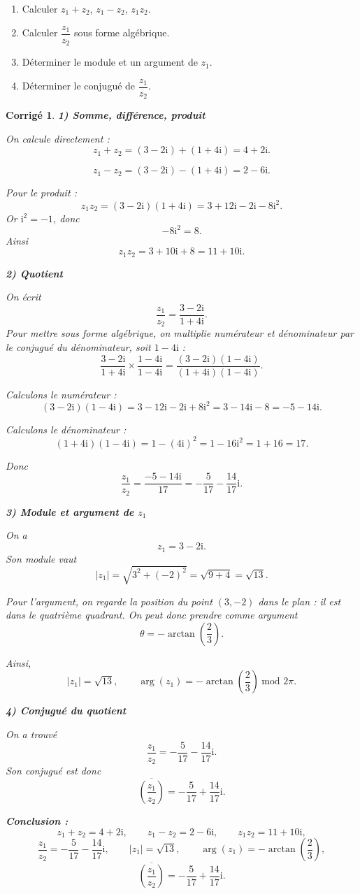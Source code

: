 \documentclass[11pt,a4paper]{article}
\newtheorem*{corrige}{Corrigé}
\newcommand{\ii}{\mathrm{i}}
\begin{document}
\begin{enumerate}
    \item Calculer \(z_1+z_2\), \(z_1-z_2\), \(z_1z_2\).
    \item Calculer \(\dfrac{z_1}{z_2}\) sous forme algébrique.
    \item Déterminer le module et un argument de \(z_1\).
    \item Déterminer le conjugué de \(\dfrac{z_1}{z_2}\).
\end{enumerate}

\begin{corrige}
\textbf{1) Somme, différence, produit}

On calcule directement :
\[
z_1+z_2=(3-2\ii)+(1+4\ii)=4+2\ii.
\]

\[
z_1-z_2=(3-2\ii)-(1+4\ii)=2-6\ii.
\]

Pour le produit :
\[
z_1z_2=(3-2\ii)(1+4\ii)=3+12\ii-2\ii-8\ii^2.
\]
Or \(\ii^2=-1\), donc
\[
-8\ii^2=8.
\]
Ainsi
\[
z_1z_2=3+10\ii+8=11+10\ii.
\]

\textbf{2) Quotient}

On écrit
\[
\frac{z_1}{z_2}=\frac{3-2\ii}{1+4\ii}.
\]
Pour mettre sous forme algébrique, on multiplie numérateur et dénominateur par le conjugué du dénominateur, soit \(1-4\ii\) :
\[
\frac{3-2\ii}{1+4\ii}\times \frac{1-4\ii}{1-4\ii}
= \frac{(3-2\ii)(1-4\ii)}{(1+4\ii)(1-4\ii)}.
\]

Calculons le numérateur :
\[
(3-2\ii)(1-4\ii)=3-12\ii-2\ii+8\ii^2=3-14\ii-8=-5-14\ii.
\]

Calculons le dénominateur :
\[
(1+4\ii)(1-4\ii)=1-(4\ii)^2=1-16\ii^2=1+16=17.
\]

Donc
\[
\frac{z_1}{z_2}=\frac{-5-14\ii}{17}=-\frac{5}{17}-\frac{14}{17}\ii.
\]

\textbf{3) Module et argument de \(z_1\)}

On a
\[
z_1=3-2\ii.
\]
Son module vaut
\[
|z_1|=\sqrt{3^2+(-2)^2}=\sqrt{9+4}=\sqrt{13}.
\]

Pour l'argument, on regarde la position du point \((3,-2)\) dans le plan : il est dans le quatrième quadrant. On peut donc prendre comme argument
\[
\theta=-\arctan\left(\frac{2}{3}\right).
\]

Ainsi,
\[
|z_1|=\sqrt{13},
\qquad
\arg(z_1)=-\arctan\left(\frac{2}{3}\right)\ \text{mod }2\pi.
\]

\textbf{4) Conjugué du quotient}

On a trouvé
\[
\frac{z_1}{z_2}=-\frac{5}{17}-\frac{14}{17}\ii.
\]
Son conjugué est donc
\[
\overline{\left(\frac{z_1}{z_2}\right)}=-\frac{5}{17}+\frac{14}{17}\ii.
\]

\textbf{Conclusion :}
\[
z_1+z_2=4+2\ii,\qquad
z_1-z_2=2-6\ii,\qquad
z_1z_2=11+10\ii,
\]
\[
\frac{z_1}{z_2}=-\frac{5}{17}-\frac{14}{17}\ii,
\qquad
|z_1|=\sqrt{13},
\qquad
\arg(z_1)=-\arctan\left(\frac{2}{3}\right),
\]
\[
\overline{\left(\frac{z_1}{z_2}\right)}=-\frac{5}{17}+\frac{14}{17}\ii.
\]
\end{corrige}
\end{document}
